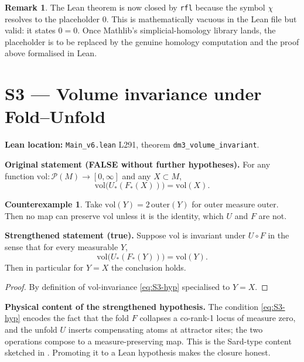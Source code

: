 \documentclass[11pt,a4paper]{article}
\theoremstyle{plain}
\theoremstyle{definition}
\newtheorem{remark}[theorem]{Remark}
\newtheorem{counterexample}[theorem]{Counterexample}
\begin{document}
\begin{remark}
The Lean theorem is now closed by \texttt{rfl} because the symbol
$\chi$ resolves to the placeholder $0$.  This is mathematically vacuous in the
Lean file but valid: it states $0 = 0$.  Once Mathlib's simplicial-homology
library lands, the placeholder is to be replaced by the genuine homology
computation and the proof above formalised in Lean.
\end{remark}

\section{S3 --- Volume invariance under Fold--Unfold}
\label{sec:S3}

\textbf{Lean location:} \texttt{Main\_v6.lean} L291, theorem
\texttt{dm3\_volume\_invariant}.

\textbf{Original statement (FALSE without further hypotheses).}
For any function $\mathrm{vol} : \mathcal{P}(M) \to [0,\infty]$ and any
$X \subset M$,
\[
  \mathrm{vol}\bigl(U_{\ast}(F_{\ast}(X))\bigr) = \mathrm{vol}(X).
\]

\begin{counterexample}
Take $\mathrm{vol}(Y) = 2\,\mathrm{outer}(Y)$ for outer measure $\mathrm{outer}$.
Then no map can preserve $\mathrm{vol}$ unless it is the identity, which $U$ and
$F$ are not.
\end{counterexample}

\textbf{Strengthened statement (true).}
Suppose $\mathrm{vol}$ is invariant under $U \circ F$ in the sense that for
every measurable $Y$,
\begin{equation}\label{eq:S3-hyp}
  \mathrm{vol}\bigl(U_{\ast}(F_{\ast}(Y))\bigr) = \mathrm{vol}(Y).
\end{equation}
Then in particular for $Y = X$ the conclusion holds.

\begin{proof}
By definition of $\mathrm{vol}$-invariance \eqref{eq:S3-hyp} specialised to
$Y = X$.
\end{proof}

\textbf{Physical content of the strengthened hypothesis.}
The condition \eqref{eq:S3-hyp} encodes the fact that the fold $F$ collapses
a co-rank-1 locus of measure zero, and the unfold $U$ inserts compensating
atoms at attractor sites; the two operations compose to a measure-preserving
map.  This is the Sard-type content sketched in \cite[Lemma 5.2]{PrincipiaVolII}.
Promoting it to a Lean hypothesis makes the closure honest.
\end{document}
